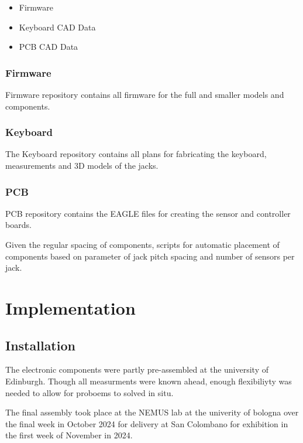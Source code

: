 \begin{itemize}
\tightlist
\item
  Firmware
\item
  Keyboard CAD Data
\item
  PCB CAD Data
\end{itemize}

\subsubsection{Firmware}\label{firmware}

Firmware repository contains all firmware for the full and smaller
models and components.

\subsubsection{Keyboard}\label{keyboard-1}

The Keyboard repository contains all plans for fabricating the keyboard,
measurements and 3D models of the jacks.

\subsubsection{PCB}\label{pcb}

PCB repository contains the EAGLE files for creating the sensor and
controller boards.

Given the regular spacing of components, scripts for automatic placement
of components based on parameter of jack pitch spacing and number of
sensors per jack.

\section{Implementation}\label{implementation}

\subsection{Installation}\label{installation}

The electronic components were partly pre-assembled at the university of
Edinburgh. Though all measurments were known ahead, enough flexibiliyty
was needed to allow for proboems to solved in situ.

The final assembly took place at the NEMUS lab at the univerity of
bologna over the final week in October 2024 for delivery at San
Colombano for exhibition in the first week of November in 2024.

